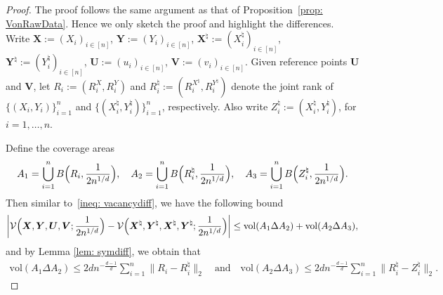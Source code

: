 \documentclass[11pt]{article}
\newcommand{\bs}[1]{\boldsymbol{#1}}
\begin{document}
\begin{proof}
The proof follows the same argument as that of Proposition~\ref{prop: VonRawData}. Hence we only sketch the proof and highlight the differences. Write $\bs{X}:=(X_i)_{i\in[n]}$, $\bs{Y}:=(Y_i)_{i\in[n]}$, ${\bs{X}^\natural}:=( X_i^\natural)_{i\in[n]}$, ${\bs Y^\natural} :=( Y_i^\natural)_{i\in[n]}$, $\bs{U}:=(u_i)_{i\in[n]}$, $\bs{V}:=(v_i)_{i\in[n]}$. Given reference points ${\bs U}$ and ${\bs V}$, let $R_i:= (R_i^X, R_i^Y)$ and $ R_i^\natural := ({R}_i^{X^\natural}, {R}_i^{Y^\natural})$ denote the joint rank of $\{(X_i, Y_i)\}_{i = 1}^n$ and $\{({X}_i^\natural, {Y}_i^\natural)\}_{i = 1}^n$, respectively. Also write $Z_i^\natural := ( X_i^\natural,  Y_i^\natural)$, for $i = 1, \ldots, n$. 

Define the coverage areas
\[
A_1 = \bigcup_{i = 1}^n B\Bigl(R_i, \frac{1}{2n^{1/d}}\Bigr), \quad {A}_2 = \bigcup_{i=1}^n B\Bigl({R}_i^\natural, \frac{1}{2n^{1/d}}\Bigr), \quad {A}_3 = \bigcup_{i=1}^n B\Bigl(Z_i^\natural, \frac{1}{2n^{1/d}}\Bigr).
\]
Then similar to~\eqref{ineq: vacancydiff}, we have the following bound
\begin{align}
     \biggl|\mathcal{V}\Bigl(\bs{X}, \bs{Y}, \bs{U}, \bs{V}; \frac{1}{2n^{1/d}} \Bigr) - \mathcal{V}\Bigl({\bs X^\natural}, {\bs Y^\natural}, {\bs X^\natural}, {\bs Y^\natural}; \frac{1}{2n^{1/d}}\Bigr)\biggr|  \leq \mathrm{vol}(A_1\Delta {A}_2) + \mathrm{vol}(A_2\Delta {A}_3), \label{ineq: vacancydiff_deterministic}
\end{align}
and by Lemma \ref{lem: symdiff}, we obtain that
\begin{align}
\mathrm{vol}(A_1\Delta {A}_2) \leq 2 d n^{-\frac{d-1}{d}} \sum_{i = 1}^n  \|R_i - {R}_i^\natural\|_2 \quad \text{and} \quad \mathrm{vol}(A_2\Delta {A}_3) \leq 2 d n^{-\frac{d-1}{d}} \sum_{i = 1}^n  \| R_i^\natural - {Z}_i^\natural\|_2. \label{ineq: coveragesymdiff_deterministic}
\end{align} 


\end{proof}
\end{document}
